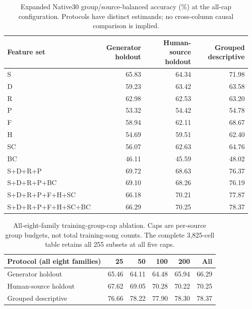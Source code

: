 \begin{table}[htbp]\centering\small
\begin{tabular}{lrrr}\toprule
Feature set & Generator holdout & Human-source holdout & Grouped descriptive\\\midrule
S & 65.83 & 64.34 & 71.98\\
D & 59.23 & 63.42 & 63.58\\
R & 62.98 & 62.53 & 63.20\\
P & 53.32 & 54.42 & 54.78\\
F & 58.94 & 62.11 & 68.67\\
H & 54.69 & 59.51 & 62.40\\
SC & 56.07 & 62.63 & 64.76\\
BC & 46.11 & 45.59 & 48.02\\
S+D+R+P & 69.72 & 68.63 & 76.37\\
S+D+R+P+BC & 69.10 & 68.26 & 76.19\\
S+D+R+P+F+H+SC & 66.18 & 70.21 & 77.87\\
S+D+R+P+F+H+SC+BC & 66.29 & 70.25 & 78.37\\
\bottomrule\end{tabular}
\caption{Expanded Native30 group/source-balanced accuracy (\%) at the all-cap configuration. Protocols have distinct estimands; no cross-column causal comparison is implied.}
\label{tab:yue2-expanded-allcap}\end{table}
\begin{table}[htbp]\centering\small
\begin{tabular}{lrrrrr}\toprule
Protocol (all eight families) & 25 & 50 & 100 & 200 & All\\\midrule
Generator holdout & 65.46 & 64.11 & 64.48 & 65.94 & 66.29\\
Human-source holdout & 67.62 & 69.05 & 70.28 & 70.22 & 70.25\\
Grouped descriptive & 76.66 & 78.22 & 77.90 & 78.30 & 78.37\\
\bottomrule\end{tabular}
\caption{All-eight-family training-group-cap ablation. Caps are per-source group budgets, not total training-song counts. The complete 3,825-cell table retains all 255 subsets at all five caps.}
\label{tab:yue2-expanded-caps}\end{table}

